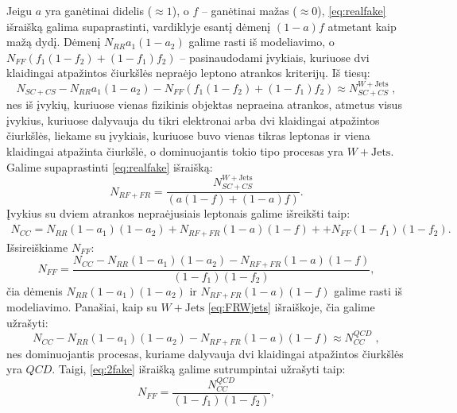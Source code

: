 \documentclass[a4paper, 12pt, oneside]{article}
\newcommand{\WJets}{W\! +\!\mathrm{Jets}}
\newcommand{\QCD}{QC\! D}
\newlength\q
\begin{document}
Jeigu $a$ yra ganėtinai didelis ($\approx \!1$), o $f$ -- ganėtinai mažas ($\approx \!0$), \eqref{eq:realfake} išraišką galima
supaprastinti, vardiklyje esantį dėmenį $(1-a)f$ atmetant kaip mažą dydį.
Dėmenį $N_{RR} a_1(1-a_2)$ galime rasti iš modeliavimo, o $N_{FF} (f_1(1-f_2)+(1-f_1)f_2)$ -- pasinaudodami
įvykiais, kuriuose dvi klaidingai atpažintos čiurkšlės nepraėjo leptono atrankos kriterijų.
Iš tiesų:
\begin{equation}
\label{eq:FRWjets}
	N_{SC\!+\!CS} - N_{RR} a_1(1-a_2)- N_{FF} (f_1(1-f_2)+(1-f_1)f_2) \approx N_{SC\!+\!CS}^{\WJets} \; ,
\end{equation}
nes iš įvykių, kuriuose vienas fizikinis objektas nepraeina atrankos, atmetus visus įvykius, kuriuose dalyvauja du tikri elektronai
arba dvi klaidingai atpažintos čiurkšlės, liekame su įvykiais, kuriuose buvo vienas tikras leptonas ir viena klaidingai atpažinta
čiurkšlė, o dominuojantis tokio tipo procesas yra $\WJets$.
Galime supaprastinti \eqref{eq:realfake} išraišką:
\begin{equation}
\label{eq:realfakeSimple}
	N_{RF\!+\!FR} = \frac{ N_{SC\!+\!CS}^{\WJets} }
				   		 { (a(1-f)+(1-a)f) }.
\end{equation}
Įvykius su dviem atrankos nepraėjusiais leptonais galime išreikšti taip:
\begin{equation}
\label{eq:2fail}
	\begin{gathered}
		N_{CC} = N_{RR} (1-a_1)(1-a_2) + N_{RF\!+\!FR} (1-a)(1-f) + 
						+ N_{FF} (1-f_1)(1-f_2).
	\end{gathered}
\end{equation}
Išsireiškiame $N_{FF}$:
\begin{equation}
\label{eq:2fake}
	N_{FF} = \frac{ N_{CC} - N_{RR} (1-a_1)(1-a_2) - N_{RF\!+\!FR} (1-a)(1-f) }
					 { (1-f_1)(1-f_2) },
\end{equation}
čia dėmenis $N_{RR} (1-a_1)(1-a_2)$ ir $N_{RF\!+\!FR} (1-a)(1-f)$ galime rasti iš modeliavimo.
Panašiai, kaip su $\WJets$ \eqref{eq:FRWjets} išraiškoje, čia galime užrašyti:
\begin{equation}
\label{eq:FRQCD}
	N_{CC} - N_{RR} (1-a_1)(1-a_2) - N_{RF\!+\!FR} (1-a)(1-f) \approx N_{CC}^{\QCD} \; ,
\end{equation}
nes dominuojantis procesas, kuriame dalyvauja dvi klaidingai atpažintos čiurkšlės yra $\QCD$.
Taigi, \eqref{eq:2fake} išraišką galime sutrumpintai užrašyti taip:
\begin{equation}
\label{eq:2fakeSimple}
	N_{FF} = \frac{ N_{CC}^{\QCD} }
				  { (1-f_1)(1-f_2) },
\end{equation}
\end{document}
